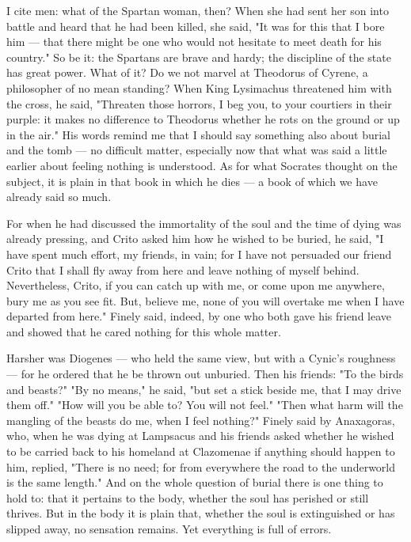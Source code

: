  I cite men: what of the Spartan woman, then? When she had sent her son into battle and heard that he had been killed, she said, "It was for this that I bore him — that there might be one who would not hesitate to meet death for his country." So be it: the Spartans are brave and hardy; the discipline of the state has great power. What of it? Do we not marvel at Theodorus of Cyrene, a philosopher of no mean standing? When King Lysimachus threatened him with the cross, he said, "Threaten those horrors, I beg you, to your courtiers in their purple: it makes no difference to Theodorus whether he rots on the ground or up in the air." His words remind me that I should say something also about burial and the tomb — no difficult matter, especially now that what was said a little earlier about feeling nothing is understood. As for what Socrates thought on the subject, it is plain in that book in which he dies — a book of which we have already said so much.

 For when he had discussed the immortality of the soul and the time of dying was already pressing, and Crito asked him how he wished to be buried, he said, "I have spent much effort, my friends, in vain; for I have not persuaded our friend Crito that I shall fly away from here and leave nothing of myself behind. Nevertheless, Crito, if you can catch up with me, or come upon me anywhere, bury me as you see fit. But, believe me, none of you will overtake me when I have departed from here." Finely said, indeed, by one who both gave his friend leave and showed that he cared nothing for this whole matter.

 Harsher was Diogenes — who held the same view, but with a Cynic's roughness — for he ordered that he be thrown out unburied. Then his friends: "To the birds and beasts?" "By no means," he said, "but set a stick beside me, that I may drive them off." "How will you be able to? You will not feel." "Then what harm will the mangling of the beasts do me, when I feel nothing?" Finely said by Anaxagoras, who, when he was dying at Lampsacus and his friends asked whether he wished to be carried back to his homeland at Clazomenae if anything should happen to him, replied, "There is no need; for from everywhere the road to the underworld is the same length." And on the whole question of burial there is one thing to hold to: that it pertains to the body, whether the soul has perished or still thrives. But in the body it is plain that, whether the soul is extinguished or has slipped away, no sensation remains. Yet everything is full of errors.

